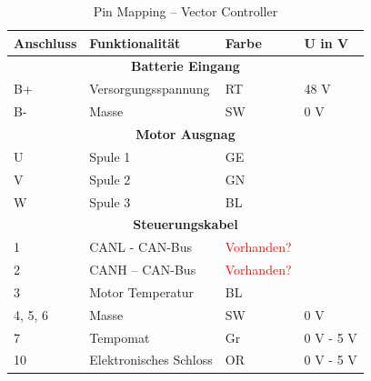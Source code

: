 \begin{table}[!ht]
	\centering
	\caption{Pin Mapping – Vector Controller}
	\label{Vector_Controller:tab:pinmapping}
	\begin{tabular}{lll|l}
		\hline
		\textbf{Anschluss}           & \textbf{Funktionalität}  & \textbf{Farbe}              & \textbf{U in V}             \\ \hline
		\multicolumn{4}{c}{\textbf{Batterie Eingang}}                                                                       \\ \hline
		\multicolumn{1}{l|}{B+}      & Versorgungsspannung      & RT                          & 48 V                        \\
		\multicolumn{1}{l|}{B-}      & Masse                    & SW                          & 0 V                         \\ \hline
		\multicolumn{4}{c}{\textbf{Motor Ausgnag}}                                                                          \\ \hline
		\multicolumn{1}{l|}{U}       & Spule 1                  & GE                          &                             \\
		\multicolumn{1}{l|}{V}       & Spule 2                  & GN                          &                             \\
		\multicolumn{1}{l|}{W}       & Spule 3                  & BL                          &                             \\ \hline
		\multicolumn{4}{c}{\textbf{Steuerungskabel}}                                                                        \\ \hline
		\multicolumn{1}{l|}{1}       & CANL - CAN-Bus           & \textcolor{red}{Vorhanden?} &                             \\
		\multicolumn{1}{l|}{2}       & CANH – CAN-Bus           & \textcolor{red}{Vorhanden?} &                             \\
		\multicolumn{1}{l|}{3}       & Motor Temperatur         & BL                          &                             \\
		\multicolumn{1}{l|}{4, 5, 6} & Masse                    & SW                          & 0 V                         \\
		\multicolumn{1}{l|}{7}       & Tempomat                 & Gr                          & 0 V - 5 V                   \\
		\multicolumn{1}{l|}{10}      & Elektronisches Schloss   & OR                          & 0 V - 5 V                   \\

\end{tabular}
\end{table}
